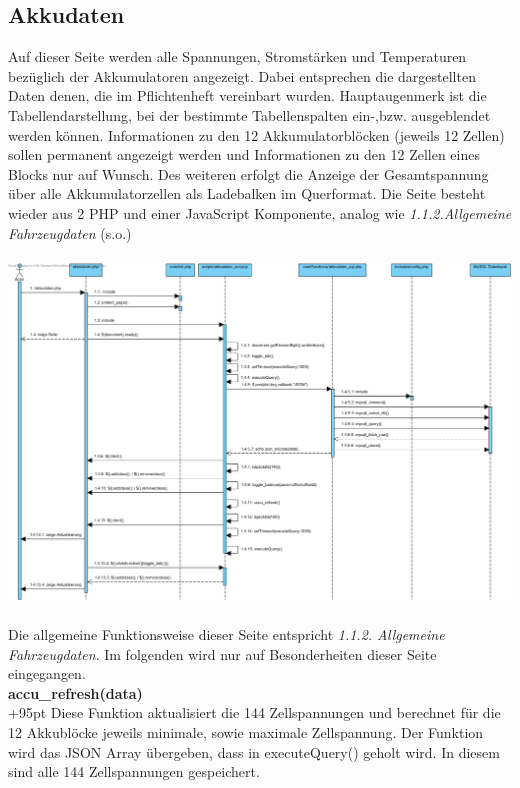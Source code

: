 \documentclass[fontsize = 12pt, paper = a4]{scrreprt}
\begin{document}
\subsection{Akkudaten}
Auf dieser Seite werden alle Spannungen, Stromstärken und Temperaturen bezüglich der Akkumulatoren angezeigt. Dabei entsprechen die dargestellten Daten denen, die im Pflichtenheft vereinbart wurden. Hauptaugenmerk  ist die Tabellendarstellung, bei der bestimmte Tabellenspalten ein-,bzw. ausgeblendet werden können. Informationen zu den 12 Akkumulatorblöcken (jeweils 12 Zellen) sollen permanent angezeigt werden und Informationen zu den 12 Zellen eines Blocks nur auf Wunsch. Des weiteren erfolgt die Anzeige der Gesamtspannung über alle Akkumulatorzellen als Ladebalken im Querformat. Die Seite besteht wieder aus 2 PHP  und einer JavaScript Komponente, analog wie \textit{ 1.1.2.Allgemeine Fahrzeugdaten} (s.o.)  
\\ \\
\includegraphics[scale=0.4255]{akkudatenvpp.png}
\\ \\ 
Die allgemeine Funktionsweise dieser Seite entspricht \textit{1.1.2. Allgemeine Fahrzeugdaten}. Im folgenden wird nur auf Besonderheiten dieser Seite eingegangen.\\

\textbf{accu\_refresh(data)}\\

\hangindent+95pt  
Diese Funktion aktualisiert die 144 Zellspannungen und berechnet für die 12 Akkublöcke jeweils minimale, sowie maximale Zellspannung. Der Funktion wird das JSON Array übergeben, dass in executeQuery() geholt wird. In diesem sind alle 144 Zellspannungen gespeichert.\\
\end{document}
